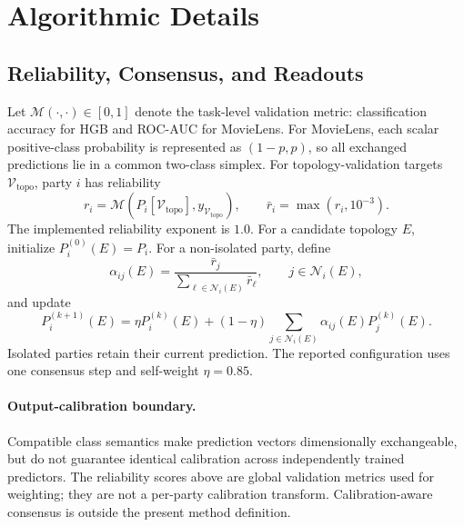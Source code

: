 \documentclass[letterpaper]{article}
\newcommand{\Ni}{\mathcal{N}_i}
\begin{document}
\section{Algorithmic Details}

\subsection{Reliability, Consensus, and Readouts}

Let $\mathcal{M}(\cdot,\cdot)\in[0,1]$ denote the task-level validation
metric: classification accuracy for HGB and ROC-AUC for MovieLens. For
MovieLens, each scalar positive-class probability is represented as
$(1-p,p)$, so all exchanged predictions lie in a common two-class simplex.
For topology-validation targets $\mathcal{V}_{\mathrm{topo}}$, party $i$ has
reliability
\begin{equation}
r_i=\mathcal{M}\!\left(
P_i[\mathcal{V}_{\mathrm{topo}}],
y_{\mathcal{V}_{\mathrm{topo}}}
\right),
\qquad
\bar r_i=\max(r_i,10^{-3}).
\end{equation}
The implemented reliability exponent is $1.0$. For a candidate topology $E$,
initialize $P_i^{(0)}(E)=P_i$. For a non-isolated party, define
\begin{equation}
\alpha_{ij}(E)=
\frac{\bar r_j}
{\sum_{\ell\in\Ni(E)}\bar r_\ell},
\qquad j\in\Ni(E),
\end{equation}
and update
\begin{equation}
P_i^{(k+1)}(E)=
\eta P_i^{(k)}(E)
+(1-\eta)\sum_{j\in\Ni(E)}
\alpha_{ij}(E)P_j^{(k)}(E).
\end{equation}
Isolated parties retain their current prediction. The reported configuration
uses one consensus step and self-weight $\eta=0.85$.

\paragraph{Output-calibration boundary.}
Compatible class semantics make prediction vectors dimensionally exchangeable,
but do not guarantee identical calibration across independently trained
predictors. The reliability scores above are global validation metrics used for
weighting; they are not a per-party calibration transform. Calibration-aware
consensus is outside the present method definition.
\end{document}
